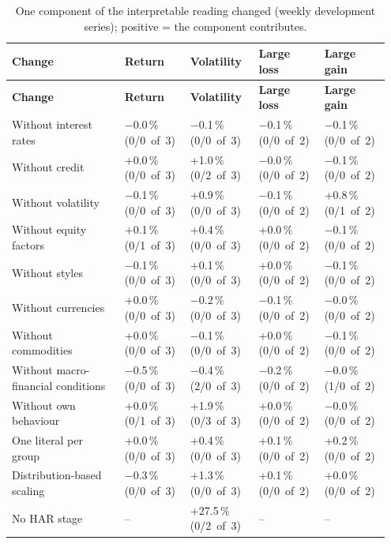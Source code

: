 {\scriptsize\setlength{\tabcolsep}{4pt}\renewcommand{\arraystretch}{1.2}
\begin{longtable}{@{}>{\raggedright\arraybackslash}p{0.290\linewidth}>{\raggedright\arraybackslash}p{0.162\linewidth}>{\raggedright\arraybackslash}p{0.170\linewidth}>{\raggedright\arraybackslash}p{0.162\linewidth}>{\raggedright\arraybackslash}p{0.162\linewidth}@{}}
\caption{One component of the interpretable reading changed (weekly development series); positive = the component contributes.}\label{tab:D2}\\
\toprule
\textbf{Change} & \textbf{Return} & \textbf{Volatility} & \textbf{Large loss} & \textbf{Large gain} \\
\midrule
\endfirsthead
\toprule
\textbf{Change} & \textbf{Return} & \textbf{Volatility} & \textbf{Large loss} & \textbf{Large gain} \\
\midrule
\endhead
\bottomrule
\endlastfoot
Without interest rates & \ensuremath{-}0.0\,\% (0/0~of~3) & \ensuremath{-}0.1\,\% (0/0~of~3) & \ensuremath{-}0.1\,\% (0/0~of~2) & \ensuremath{-}0.1\,\% (0/0~of~2) \\
Without credit & +0.0\,\% (0/0~of~3) & +1.0\,\% (0/2~of~3) & \ensuremath{-}0.0\,\% (0/0~of~2) & \ensuremath{-}0.1\,\% (0/0~of~2) \\
Without volatility & \ensuremath{-}0.1\,\% (0/0~of~3) & +0.9\,\% (0/0~of~3) & \ensuremath{-}0.1\,\% (0/0~of~2) & +0.8\,\% (0/1~of~2) \\
Without equity factors & +0.1\,\% (0/1~of~3) & +0.4\,\% (0/0~of~3) & +0.0\,\% (0/0~of~2) & \ensuremath{-}0.1\,\% (0/0~of~2) \\
Without styles & \ensuremath{-}0.1\,\% (0/0~of~3) & +0.1\,\% (0/0~of~3) & +0.0\,\% (0/0~of~2) & \ensuremath{-}0.1\,\% (0/0~of~2) \\
Without currencies & +0.0\,\% (0/0~of~3) & \ensuremath{-}0.2\,\% (0/0~of~3) & \ensuremath{-}0.1\,\% (0/0~of~2) & \ensuremath{-}0.0\,\% (0/0~of~2) \\
Without commodities & +0.0\,\% (0/0~of~3) & \ensuremath{-}0.1\,\% (0/0~of~3) & +0.0\,\% (0/0~of~2) & \ensuremath{-}0.1\,\% (0/0~of~2) \\
Without macro-financial conditions & \ensuremath{-}0.5\,\% (0/0~of~3) & \ensuremath{-}0.4\,\% (2/0~of~3) & \ensuremath{-}0.2\,\% (0/0~of~2) & \ensuremath{-}0.0\,\% (1/0~of~2) \\
Without own behaviour & +0.0\,\% (0/1~of~3) & +1.9\,\% (0/3~of~3) & +0.0\,\% (0/0~of~2) & \ensuremath{-}0.0\,\% (0/0~of~2) \\
One literal per group & +0.0\,\% (0/0~of~3) & +0.4\,\% (0/0~of~3) & +0.1\,\% (0/0~of~2) & +0.2\,\% (0/0~of~2) \\
Distribution-based scaling & \ensuremath{-}0.3\,\% (0/0~of~3) & +1.3\,\% (0/0~of~3) & +0.1\,\% (0/0~of~2) & +0.0\,\% (0/0~of~2) \\
No HAR stage & -- & +27.5\,\% (0/2~of~3) & -- & -- \\
\end{longtable}}
